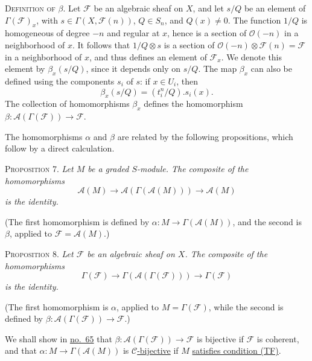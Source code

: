 \label{fac:III:2:no:59:def:beta}
\textsc{Definition of $\beta$.}
Let $\mathcal{F}$ be an algebraic sheaf on $X$, and let $s/Q$ be an
element of $\Gamma(\mathcal{F})_x$, with
$s\in\Gamma(X,\mathcal{F}(n))$, $Q\in S_n$, and $Q(x)\ne0$. The
function $1/Q$ is homogeneous of degree $-n$ and regular at $x$, hence
is a section of $\mathcal{O}(-n)$ in a neighborhood of $x$. It follows
that $1/Q\otimes s$ is a section of
$\mathcal{O}(-n)\otimes\mathcal{F}(n)=\mathcal{F}$ in a neighborhood
of $x$, and thus defines an element of $\mathcal{F}_x$. We denote this
element by $\beta_x(s/Q)$, since it depends only on $s/Q$. The map
$\beta_x$ can also be defined using the components $s_i$ of $s$: if
$x\in U_i$, then
\label{fac:III:2:no:59:formula:beta-x}
\[
\beta_x(s/Q)=(t_i^n/Q).s_i(x).
\]
The collection of homomorphisms $\beta_x$ defines the homomorphism
$\beta:\mathcal{A}(\Gamma(\mathcal{F}))\to\mathcal{F}$.

The homomorphisms $\alpha$ and $\beta$ are related by the following
propositions, which follow by a direct calculation.

\label{fac:III:2:no:59:prop:7}
\textsc{Proposition 7.} \textit{Let $M$ be a graded $S$-module. The
composite of the homomorphisms}
\label{fac:III:2:no:59:formula:prop7-composite}
\[
\mathcal{A}(M)\longrightarrow
\mathcal{A}(\Gamma(\mathcal{A}(M)))\longrightarrow\mathcal{A}(M)
\]
\textit{is the identity.}

(The first homomorphism is defined by
$\alpha:M\to\Gamma(\mathcal{A}(M))$, and the second is $\beta$, applied
to $\mathcal{F}=\mathcal{A}(M)$.)

\label{fac:III:2:no:59:prop:8}
\textsc{Proposition 8.} \textit{Let $\mathcal{F}$ be an algebraic sheaf
on $X$. The composite of the homomorphisms}
\label{fac:III:2:no:59:formula:prop8-composite}
\[
\Gamma(\mathcal{F})\longrightarrow
\Gamma(\mathcal{A}(\Gamma(\mathcal{F})))
\longrightarrow\Gamma(\mathcal{F})
\]
\textit{is the identity.}

(The first homomorphism is $\alpha$, applied to
$M=\Gamma(\mathcal{F})$, while the second is defined by
$\beta:\mathcal{A}(\Gamma(\mathcal{F}))\to\mathcal{F}$.)

\label{fac:III:2:no:59:forecast:no:65}
We shall show in \hyperref[fac:III:3:no:65]{no.~65} that
$\beta:\mathcal{A}(\Gamma(\mathcal{F}))\to\mathcal{F}$ is bijective if
$\mathcal{F}$ is coherent, and that
$\alpha:M\to\Gamma(\mathcal{A}(M))$ is
\hyperref[fac:III:2:no:56:def:C-morphism]{$\mathcal{C}$-bijective} if
$M$ \hyperref[fac:III:2:no:56:def:TF]{satisfies condition (TF)}.
